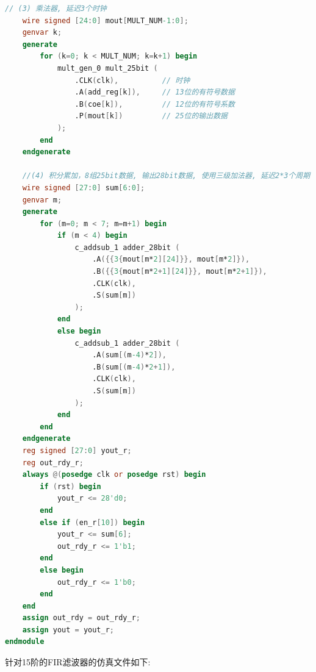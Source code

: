 \documentclass{article}
\begin{document}
\begin{lstlisting}[language=Verilog, caption={15阶并行FIR滤波器}]
    // (3) 乘法器, 延迟3个时钟
    wire signed [24:0] mout[MULT_NUM-1:0];
    genvar k;
    generate
        for (k=0; k < MULT_NUM; k=k+1) begin
            mult_gen_0 mult_25bit (
                .CLK(clk),          // 时钟
                .A(add_reg[k]),     // 13位的有符号数据
                .B(coe[k]),         // 12位的有符号系数
                .P(mout[k])         // 25位的输出数据
            );
        end
    endgenerate
    
    //(4) 积分累加，8组25bit数据, 输出28bit数据, 使用三级加法器, 延迟2*3个周期
    wire signed [27:0] sum[6:0];
    genvar m;
    generate
        for (m=0; m < 7; m=m+1) begin
            if (m < 4) begin
                c_addsub_1 adder_28bit (
                    .A({{3{mout[m*2][24]}}, mout[m*2]}),
                    .B({{3{mout[m*2+1][24]}}, mout[m*2+1]}),
                    .CLK(clk),
                    .S(sum[m])
                );
            end
            else begin
                c_addsub_1 adder_28bit (
                    .A(sum[(m-4)*2]),
                    .B(sum[(m-4)*2+1]),
                    .CLK(clk),
                    .S(sum[m])
                );
            end
        end
    endgenerate
    reg signed [27:0] yout_r;
    reg out_rdy_r;
    always @(posedge clk or posedge rst) begin
        if (rst) begin
            yout_r <= 28'd0;
        end
        else if (en_r[10]) begin
            yout_r <= sum[6];
            out_rdy_r <= 1'b1;
        end
        else begin
            out_rdy_r <= 1'b0;
        end
    end
    assign out_rdy = out_rdy_r;
    assign yout = yout_r;
endmodule
\end{lstlisting}
针对15阶的FIR滤波器的仿真文件如下:
\end{document}
